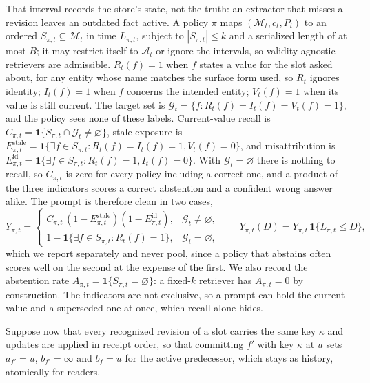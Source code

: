 \documentclass{article} %
\begin{document}
That interval records the store's state, not the truth: an extractor that misses a revision leaves an outdated fact active. A policy $\pi$ maps $(\mathcal{M}_t,c_t,P_t)$ to an ordered $S_{\pi,t}\subseteq\mathcal{M}_t$ in time $L_{\pi,t}$, subject to $|S_{\pi,t}|\le k$ and a serialized length of at most $B$; it may restrict itself to $\mathcal{A}_t$ or ignore the intervals, so validity-agnostic retrievers are admissible. $R_t(f)=1$ when $f$ states a value for the slot asked about, for any entity whose name matches the surface form used, so $R_t$ ignores identity; $I_t(f)=1$ when $f$ concerns the intended entity; $V_t(f)=1$ when its value is still current. The target set is $\mathcal{G}_t=\{f:R_t(f)=I_t(f)=V_t(f)=1\}$, and the policy sees none of these labels. Current-value recall is $C_{\pi,t}=\mathbf{1}\{S_{\pi,t}\cap\mathcal{G}_t\neq\varnothing\}$, stale exposure is $E^{\mathrm{stale}}_{\pi,t}=\mathbf{1}\{\exists f\in S_{\pi,t}:R_t(f)=I_t(f)=1,V_t(f)=0\}$, and misattribution is $E^{\mathrm{id}}_{\pi,t}=\mathbf{1}\{\exists f\in S_{\pi,t}:R_t(f)=1,I_t(f)=0\}$. With $\mathcal{G}_t=\varnothing$ there is nothing to recall, so $C_{\pi,t}$ is zero for every policy including a correct one, and a product of the three indicators scores a correct abstention and a confident wrong answer alike. The prompt is therefore clean in two cases,
\begin{equation}
Y_{\pi,t}=
\begin{cases}
C_{\pi,t}\,(1-E^{\mathrm{stale}}_{\pi,t})(1-E^{\mathrm{id}}_{\pi,t}), & \mathcal{G}_t\neq\varnothing,\\[2pt]
1-\mathbf{1}\{\exists f\in S_{\pi,t}:R_t(f)=1\}, & \mathcal{G}_t=\varnothing,
\end{cases}
\qquad Y_{\pi,t}(D)=Y_{\pi,t}\,\mathbf{1}\{L_{\pi,t}\le D\},
\label{eq:clean}
\end{equation}
which we report separately and never pool, since a policy that abstains often scores well on the second at the expense of the first. We also record the abstention rate $A_{\pi,t}=\mathbf{1}\{S_{\pi,t}=\varnothing\}$: a fixed-$k$ retriever has $A_{\pi,t}=0$ by construction. The indicators are not exclusive, so a prompt can hold the current value and a superseded one at once, which recall alone hides.

Suppose now that every recognized revision of a slot carries the same key $\kappa$ and updates are applied in receipt order, so that committing $f'$ with key $\kappa$ at $u$ sets $a_{f'}=u$, $b_{f'}=\infty$ and $b_f=u$ for the active predecessor, which stays as history, atomically for readers.
\end{document}
